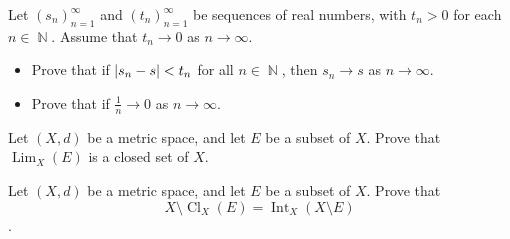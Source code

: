 \documentclass[12pt,letterpaper,boxed]{hmcpset}
\DeclareMathOperator{\Lim}{Lim}
\DeclareMathOperator{\Int}{Int}
\DeclareMathOperator{\Cl}{Cl}
\DeclareMathOperator{\N}{\mathbb{N}}
\DeclarePairedDelimiter\abs{\lvert}{\rvert}%
\begin{document}
\begin{problem}[Exercise 1.15]
Let $(s_n)_{n=1}^{\infty}$ and $(t_n)_{n=1}^{\infty}$ be sequences of real numbers, with $t_n > 0$ for each $n\in\N.$ Assume that $t_n \rightarrow 0$ as $n\rightarrow \infty.$
\vspace{-2mm}
\begin{itemize}
	\itemsep0em
	\item Prove that if $\abs{s_n - s} < t_n$ for all $n \in \N$, then $s_n \rightarrow s$ as $n \rightarrow \infty.$
	\item Prove that if $\frac{1}{n}\rightarrow 0$ as $n\rightarrow \infty.$
\end{itemize}
\end{problem}

\begin{solution}

\end{solution}

\begin{problem}[Exercise 1.21]
Let $(X,d)$ be a metric space, and let $E$ be a subset of $X$. Prove that $\Lim_X(E)$ is a closed set of $X$.
\end{problem}

\begin{solution}

\end{solution}

\begin{problem}[Exercise 1.24]
Let $(X,d)$ be a metric space, and let $E$ be a subset of $X$. Prove that $$X\setminus\Cl_X(E)=\Int_X(X\setminus E)$$. 
\end{problem}

\begin{solution}

\end{solution}
\end{document}
